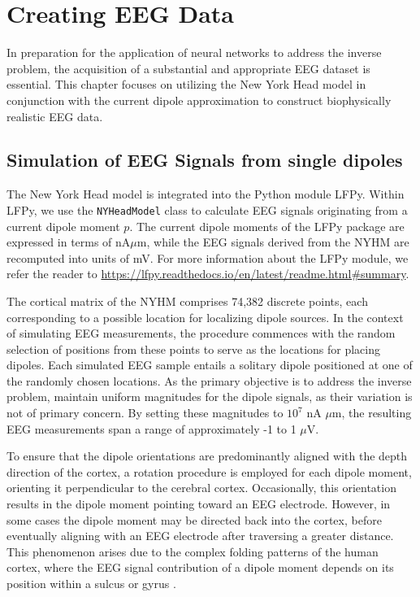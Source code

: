 \documentclass[a4paper, UKenglish, 11pt]{uiomaster}
\begin{document}
\chapter{Creating EEG Data}
In preparation for the application of neural networks to address the inverse problem, the acquisition of a substantial and appropriate EEG dataset is essential. This chapter focuses on utilizing the New York Head model in conjunction with the current dipole approximation to construct biophysically realistic EEG data.

\section{Simulation of EEG Signals from single dipoles}
The New York Head model is integrated into the Python module LFPy. Within LFPy, we use the \texttt{NYHeadModel} class to calculate EEG signals originating from a current dipole moment $p$. The current dipole moments of the LFPy package are expressed in terms of nA$\mu$m, while the EEG signals derived from the NYHM are recomputed into units of mV. For more information about the LFPy module, we refer the reader to \url{https://lfpy.readthedocs.io/en/latest/readme.html#summary}.

The cortical matrix of the NYHM comprises 74,382 discrete points, each corresponding to a possible location for localizing dipole sources. In the context of simulating EEG measurements, the procedure commences with the random selection of positions from these points to serve as the locations for placing dipoles. Each simulated EEG sample entails a solitary dipole positioned at one of the randomly chosen locations. As the primary objective is to address the inverse problem, maintain uniform magnitudes for the dipole signals, as their variation is not of primary concern. By setting these magnitudes to $10^7$ nA $\mu$m, the resulting EEG measurements span a range of approximately -1 to 1 $\mu$V.

To ensure that the dipole orientations are predominantly aligned with the depth direction of the cortex, a rotation procedure is employed for each dipole moment, orienting it perpendicular to the cerebral cortex. Occasionally, this orientation results in the dipole moment pointing toward an EEG electrode. However, in some cases the dipole moment may be directed back into the cortex, before eventually aligning with an EEG electrode after traversing a greater distance. This phenomenon arises due to the complex folding patterns of the human cortex, where the EEG signal contribution of a dipole moment depends on its position within a sulcus or gyrus \cite{naess2021biophysically}.
\end{document}
